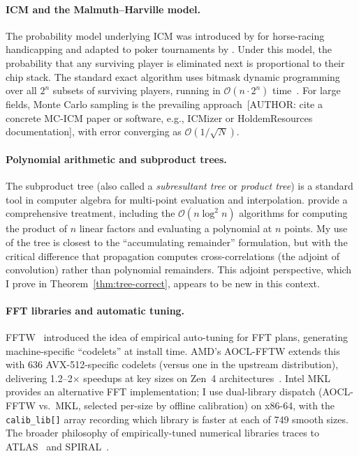 \documentclass[11pt]{article}
\newcommand{\bigO}{\mathcal{O}}
\begin{document}
\paragraph{ICM and the Malmuth--Harville model.}
The probability model underlying ICM was introduced by
\citet{harville1973} for horse-racing handicapping and adapted to poker
tournaments by \citet{malmuth2001}. Under this model, the probability
that any surviving player is eliminated next is proportional to their
chip stack. The standard exact algorithm uses bitmask dynamic programming
over all $2^n$ subsets of surviving players, running in
$\bigO(n \cdot 2^n)$ time~\citep[and references therein]{malmuth2001}.
For large fields, Monte Carlo sampling is the prevailing
approach~[AUTHOR: cite a concrete MC-ICM paper or software, e.g., ICMizer
or HoldemResources documentation], with error converging as
$\bigO(1/\sqrt{N})$.

\paragraph{Polynomial arithmetic and subproduct trees.}
The subproduct tree (also called a \emph{subresultant tree} or
\emph{product tree}) is a standard tool in computer algebra for
multi-point evaluation and interpolation.
\citet{vonzurgathen2013} provide a comprehensive treatment, including the
$\bigO(n \log^2 n)$ algorithms for computing the product of $n$ linear
factors and evaluating a polynomial at $n$ points. My use of the tree is
closest to the ``accumulating remainder'' formulation, but with the
critical difference that propagation computes cross-correlations (the
adjoint of convolution) rather than polynomial remainders. This adjoint
perspective, which I prove in Theorem~\ref{thm:tree-correct}, appears to
be new in this context.

\paragraph{FFT libraries and automatic tuning.}
FFTW~\citep{frigo2005} introduced the idea of empirical auto-tuning for
FFT plans, generating machine-specific ``codelets'' at install time.
AMD's AOCL-FFTW extends this with 636 AVX-512-specific codelets (versus
one in the upstream distribution), delivering 1.2--2$\times$ speedups at
key sizes on Zen~4 architectures~\citep{aocl2024}. Intel
MKL~\citep{intel2024mkl} provides an alternative FFT implementation;
I use dual-library dispatch (AOCL-FFTW vs.\ MKL, selected per-size by
offline calibration) on x86-64, with the \texttt{calib\_lib[]} array
recording which library is faster at each of 749 smooth sizes. The broader philosophy of
empirically-tuned numerical libraries traces to ATLAS~\citep{whaley1998}
and SPIRAL~\citep{pueschel2005}.
\end{document}
